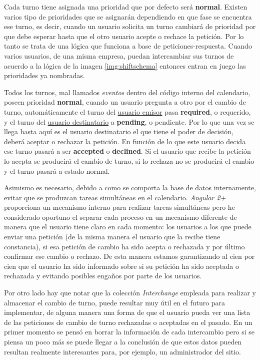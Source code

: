  \label{img:shiftschema}
 
Cada turno tiene asignada una prioridad que por defecto será  \textbf{normal}. Existen varios tipo de prioridades que se asignarán dependiendo en que fase se encuentra ese turno, es decir, cuando un usuario solicita un turno cambiará de prioridad por que debe esperar hasta que el otro usuario acepte o rechace la petición. Por lo tanto se trata de una lógica que funciona a base de peticiones-respuesta. Cuando varios usuarios, de una misma empresa, puedan intercambiar sus turnos de acuerdo a la lógica de la imagen \ref{img:shiftschema} entonces entran en juego las prioridades ya nombradas.  

 
 Todos los turnos, mal llamados \emph{eventos} dentro del código interno del calendario, poseen prioridad \textbf{normal}, cuando un usuario pregunta a otro por el cambio de turno, automáticamente el turno del \underline{usuario emisor} pasa \textbf{required}, o requerido, y el turno del \underline{usuario destinatario} a \textbf{pending}, o pendiente. Por lo que una vez se llega hasta aquí es el usuario destinatario el que tiene el poder de decisión, deberá aceptar o rechazar la petición. En función de lo que este usuario decida ese turno pasará a ser \textbf{accepted} o \textbf{declined}. Si el usuario que recibe la petición lo acepta se producirá el cambio de turno, si lo rechaza no se producirá el cambio y el turno pasará a estado normal.
 
 Asimismo es necesario, debido a como se comporta la base de datos internamente, evitar que se produzcan tareas simultáneas en el calendario. \emph{Angular 2+} proporciona un mecanismo interno para realizar tareas simultáneas pero he considerado oportuno el separar cada proceso en un mecanismo diferente de manera que el usuario tiene claro en cada momento: los usuarios a los que puede enviar una petición (de la misma manera el usuario que la recibe tiene constancia), si esa petición de cambio ha sido acepta o rechazada y por último confirmar ese cambio o rechazo. De esta manera estamos garantizando al cien por cien que el usuario ha sido informado sobre si su petición ha sido aceptada o rechazada y evitando posibles engaños por parte de los usuarios.
 
 Por otro lado hay que notar que la colección \emph{Interchange} empleada para realizar y almacenar el cambio de turno, puede resultar muy útil en el futuro para implementar, de alguna manera una forma de que el usuario pueda ver una lista de las peticiones de cambio de turno rechazadas o aceptadas en el pasado. En un primer momento se pensó en borrar la información de cada intercambio pero si se piensa un poco más se puede llegar a la conclusión de que estos datos pueden resultan realmente interesantes para, por ejemplo, un administrador del sitio. 
 


